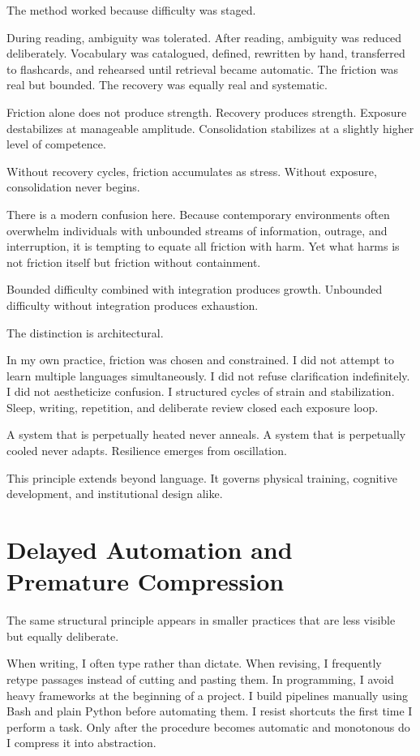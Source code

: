 \documentclass[12pt]{article}
\begin{document}
The method worked because difficulty was staged.

During reading, ambiguity was tolerated. After reading, ambiguity was reduced deliberately. Vocabulary was catalogued, defined, rewritten by hand, transferred to flashcards, and rehearsed until retrieval became automatic. The friction was real but bounded. The recovery was equally real and systematic.

Friction alone does not produce strength. Recovery produces strength. Exposure destabilizes at manageable amplitude. Consolidation stabilizes at a slightly higher level of competence.

Without recovery cycles, friction accumulates as stress. Without exposure, consolidation never begins.

There is a modern confusion here. Because contemporary environments often overwhelm individuals with unbounded streams of information, outrage, and interruption, it is tempting to equate all friction with harm. Yet what harms is not friction itself but friction without containment.

Bounded difficulty combined with integration produces growth. Unbounded difficulty without integration produces exhaustion.

The distinction is architectural.

In my own practice, friction was chosen and constrained. I did not attempt to learn multiple languages simultaneously. I did not refuse clarification indefinitely. I did not aestheticize confusion. I structured cycles of strain and stabilization. Sleep, writing, repetition, and deliberate review closed each exposure loop.

A system that is perpetually heated never anneals. A system that is perpetually cooled never adapts. Resilience emerges from oscillation.

This principle extends beyond language. It governs physical training, cognitive development, and institutional design alike.

\section*{Delayed Automation and Premature Compression}

The same structural principle appears in smaller practices that are less visible but equally deliberate.

When writing, I often type rather than dictate. When revising, I frequently retype passages instead of cutting and pasting them. In programming, I avoid heavy frameworks at the beginning of a project. I build pipelines manually using Bash and plain Python before automating them. I resist shortcuts the first time I perform a task. Only after the procedure becomes automatic and monotonous do I compress it into abstraction.
\end{document}
